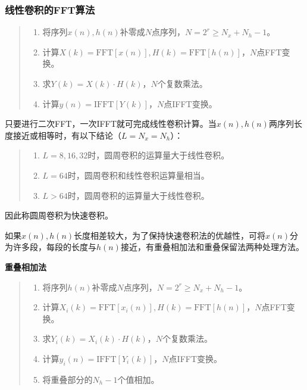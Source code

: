 \documentclass[cn, hazy, blue, normal, 12pt]{elegantnote}
\begin{document}
\subsubsection{线性卷积的FFT算法}

\begin{quote}
\begin{enumerate}
    \item 将序列$x(n), h(n)$补零成$N$点序列，$N=2^r\geq N_x+N_h-1$。
    \item 计算$X(k)=\text{FFT}[x(n)], H(k)=\text{FFT}[h(n)]$，$N$点FFT变换。
    \item 求$Y(k)=X(k)\cdot H(k)$，$N$个复数乘法。
    \item 计算$y(n)=\text{IFFT}[Y(k)]$，$N$点IFFT变换。
\end{enumerate}
\end{quote}

只要进行二次FFT，一次IFFT就可完成线性卷积计算。当$x(n), h(n)$两序列长度接近或相等时，有以下结论（$L=N_x=N_h$）：

\begin{quote}
\begin{enumerate}
    \item $L=8, 16, 32$时，圆周卷积的运算量大于线性卷积。
    \item $L=64$时，圆周卷积和线性卷积运算量相当。
    \item $L>64$时，圆周卷积的运算量大于线性卷积。
\end{enumerate}
\end{quote}

因此称圆周卷积为快速卷积。

如果$x(n), h(n)$长度相差较大，为了保持快速卷积法的优越性，可将$x(n)$分为许多段，每段的长度与$h(n)$接近，有重叠相加法和重叠保留法两种处理方法。

\textbf{重叠相加法}

\begin{quote}
\begin{enumerate}
    \item 将序列$h(n)$补零成$N$点序列，$N=2^r\geq N_x+N_h-1$。
    \item 计算$X_i(k)=\text{FFT}[x_i(n)], H(k)=\text{FFT}[h(n)]$，$N$点FFT变换。
    \item 求$Y_i(k)=X_i(k)\cdot H(k)$，$N$个复数乘法。
    \item 计算$y_i(n)=\text{IFFT}[Y_i(k)]$，$N$点IFFT变换。
    \item 将重叠部分的$N_h-1$个值相加。
\end{enumerate}
\end{quote}
\end{document}
